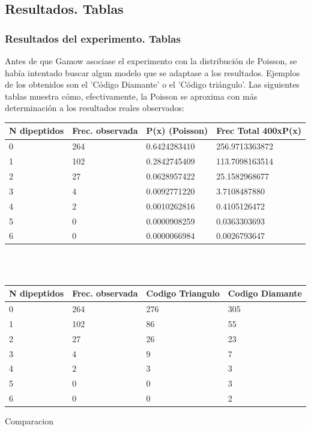 \documentclass{beamer}
\begin{document}
\subsection{Resultados. Tablas}
\begin{frame}
\frametitle{Resultados del experimento. Tablas}

Antes de que Gamow asociase el experimento con la distribución de Poisson, se había intentado buscar algun modelo que se adaptase a los resultados. Ejemplos de los obtenidos son el 'Código Diamante' o el 'Código triángulo'. Las siguientes tablas muestra cómo, efectivamente, la Poisson se aproxima con más determinación a los resultados reales observados:

\end{frame}
\begin{frame}

\begin{center}
\begin{tabular}{llll}
N dipeptidos & Frec. observada & P(x) (Poisson) & Frec Total 400xP(x) \\
\hline
0 & 264 & 0.6424283410 & 256.9713363872\\
1 & 102 & 0.2842745409 & 113.7098163514\\
2 & 27 & 0.0628957422 & 25.1582968677\\
3 & 4 & 0.0092771220 & 3.7108487880\\
4 & 2 & 0.0010262816 & 0.4105126472\\
5 & 0 & 0.0000908259 & 0.0363303693\\
6 & 0 & 0.0000066984 & 0.0026793647

\end{tabular}
\\
\\
\begin{tabular}{llll}
N dipeptidos & Frec. observada & Codigo Triangulo & Codigo Diamante\\
\hline
0 & 264 & 276 & 305\\
1 & 102 & 86 & 55\\
2 & 27 & 26 & 23\\
3 & 4 & 9 & 7\\
4 & 2 & 3 & 3\\
5 & 0 & 0 & 3\\
6 & 0 & 0 & 2
\end{tabular}
\end{center}
\caption{Comparacion}
\label{tabla}


\end{frame}
\end{document}
